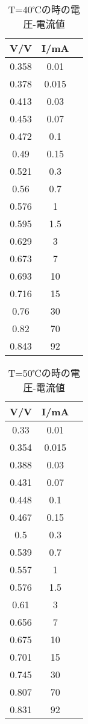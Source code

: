 \documentclass[11pt,a4j]{jsarticle}
\begin{document}
 \begin{table}[htb]
  \begin{center}
    \caption{T=40℃の時の電圧-電流値}
    \begin{tabular}{ccc} \toprule
V/V	&	I/mA\\ \midrule
0.358	&	0.01\\
0.378	&	0.015\\
0.413	&	0.03\\
0.453	&	0.07\\
0.472	&	0.1\\
0.49	&	0.15\\
0.521	&	0.3\\
0.56	&	0.7\\
0.576	&	1\\
0.595	&	1.5\\
0.629	&	3\\
0.673	&	7\\
0.693	&	10\\
0.716	&	15\\
0.76	&	30\\
0.82	&	70\\
0.843	&	92\\ \bottomrule
    \end{tabular}
    \label{tab:price}
  \end{center}
\end{table}

 
 \begin{table}[htb]
  \begin{center}
    \caption{T=50℃の時の電圧-電流値}
    \begin{tabular}{ccc} \toprule
V/V	&	I/mA\\ \midrule
0.33	&	0.01\\
0.354	&	0.015\\
0.388	&	0.03\\
0.431	&	0.07\\
0.448	&	0.1\\
0.467	&	0.15\\
0.5	&	0.3\\
0.539	&	0.7\\
0.557	&	1\\
0.576	&	1.5\\
0.61	&	3\\
0.656	&	7\\
0.675	&	10\\
0.701	&	15\\
0.745	&	30\\
0.807	&	70\\
0.831	&	92\\ \bottomrule
    \end{tabular}
    \label{tab:price}
  \end{center}
\end{table}
\end{document}
